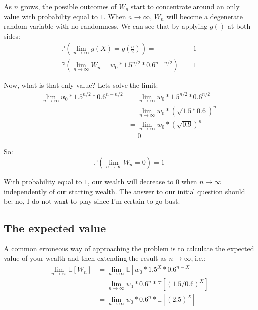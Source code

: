 \documentclass[12pt]{article}
\begin{document}
As $n$ grows, the possible outcomes of $W_n$ start to concentrate around an only value with probability equal to $1$. When $n \rightarrow \infty$, $W_n$ will become a degenerate random variable with no randomness. We can see that by applying $g()$ at both sides:
\begin{equation*}
  \begin{split}
    \mathbb{P}(\lim_{n\to\infty} g(X) = g(\tfrac{n}{2})) =& 1\\
    \mathbb{P}(\lim_{n\to\infty} W_n = w_0 * 1.5^{n/2} * 0.6^{n-n/2}) =& 1
    \end{split}
\end{equation*}

Now, what is that only value? Lets solve the limit:
\begin{equation*}
  \begin{split}
    \lim_{n\to\infty} w_0 * 1.5^{n/2} * 0.6^{n-n/2} & = \lim_{n\to\infty}w_0 * 1.5^{n/2} * 0.6^{n/2} \\
    &= \lim_{n\to\infty}w_0 * (\sqrt{1.5*0.6})^{n}\\
    &= \lim_{n\to\infty}w_0 * (\sqrt{0.9}) ^{n}\\
    &= 0
  \end{split}
\end{equation*}

So:
\begin{equation*}
    \mathbb{P}(\lim_{n\to\infty} W_n = 0) = 1
\end{equation*}

With probability equal to $1$, our wealth will decrease to 0 when $n\to\infty$ independently of our starting wealth. The answer to our initial question should be: no, I do not want to play since I'm certain to go bust.

\subsection{The expected value}
A common erroneous way of approaching the problem is to calculate the expected value of your wealth and then extending the result as $n\to\infty$, i.e.:
\begin{equation*}
  \begin{split}
    \lim_{n\to\infty}\mathbb{E}[W_n] &= \lim_{n\to\infty}\mathbb{E}[w_0 * 1.5^X * 0.6^{n-X}]\\
    & = \lim_{n\to\infty} w_0 * 0.6^n * \mathbb{E}[(1.5/0.6)^X]\\
    & = \lim_{n\to\infty} w_0 * 0.6^n * \mathbb{E}[(2.5)^X]
  \end{split}
\end{equation*}
\end{document}
